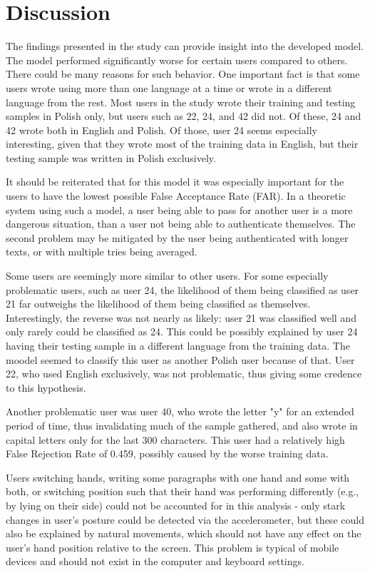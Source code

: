 \section{Discussion}
The findings presented in the study can provide insight into the developed model. The model performed significantly worse for certain users compared to others. There could be many reasons for such behavior. One important fact is that some users wrote using more than one language at a time or wrote in a different language from the rest. Most users in the study wrote their training and testing samples in Polish only, but users such as 22, 24, and 42 did not. Of these, 24 and 42 wrote both in English and Polish. Of those, user 24 seems especially interesting, given that they wrote most of the training data in English, but their testing sample was written in Polish exclusively.

It should be reiterated that for this model it was especially important for the users to have the lowest possible False Acceptance Rate (FAR). In a theoretic system using such a model, a user being able to pass for another user is a more dangerous situation, than a user not being able to authenticate themselves. The second problem may be mitigated by the user being authenticated with longer texts, or with multiple tries being averaged.

Some users are seemingly more similar to other users. For some especially problematic users, such as user 24, the likelihood of them being classified as user 21 far outweighs the likelihood of them being classified as themselves. Interestingly, the reverse was not nearly as likely: user 21 was classified well and only rarely could be classified as 24. This could be possibly explained by user 24 having their testing sample in a different language from the training data. The moodel seemed to classify this user as another Polish user because of that. User 22, who used English exclusively, was not problematic, thus giving some credence to this hypothesis.

Another problematic user was user 40, who wrote the letter "y" for an extended period of time, thus invalidating much of the sample gathered, and also wrote in capital letters only for the last 300 characters. This user had a relatively high False Rejection Rate of 0.459, possibly caused by the worse training data.

Users switching hands, writing some paragraphs with one hand and some with both, or switching position such that their hand was performing differently (e.g., by lying on their side) could not be accounted for in this analysis - only stark changes in user's posture could be detected via the accelerometer, but these could also be explained by natural movements, which should not have any effect on the user's hand position relative to the screen. This problem is typical of mobile devices and should not exist in the computer and keyboard settings.

